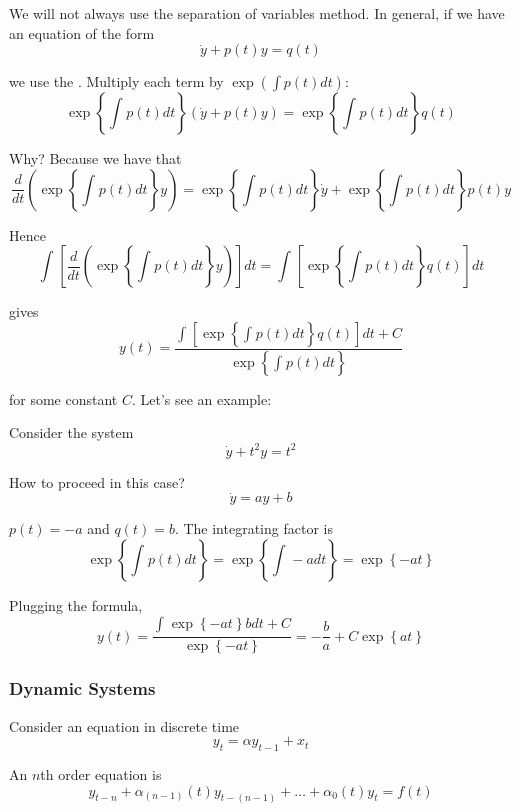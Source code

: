 \documentclass{article}
\begin{document}
We will not always use the separation of variables method. In general, if we have an equation of the form
\[
  \dot{y} + p(t) y = q(t)
\]

we use the . Multiply each term by $\exp(\int p(t) dt)$:
\[
  \exp\left\{\int_{}^{} p(t) dt\right\}
  \left(\dot{y} + p(t) y\right)
  =
  \exp\left\{\int_{}^{} p(t) dt\right\}
  q(t)
\]

Why? Because we have that
\[
  \dfrac{d}{dt}
  \left(
    \exp\left\{\int_{}^{} p(t) dt\right\}
    y
  \right)
  =
  \exp\left\{\int_{}^{} p(t) dt\right\} \dot{y}
  +
  \exp\left\{\int_{}^{} p(t) dt\right\} p(t) y
\]

Hence
\[
  \int_{}^{}
  \left[
    \dfrac{d}{dt}
    \left(
      \exp\left\{\int_{}^{} p(t) dt\right\}
      y
    \right)
  \right]
  dt
  =
  \int_{}^{}
  \left[
    \exp\left\{\int_{}^{} p(t) dt\right\}
    q(t)
  \right]
  dt
\]

gives
\[
  y(t)
  =
  \dfrac{
    \int_{}^{}
    \left[
      \exp\left\{\int_{}^{} p(t) dt\right\}
      q(t)
    \right]
    dt
    +
    C
  }{
    \exp\left\{\int_{}^{} p(t) dt\right\}
  }
\]

for some constant $C$. Let's see an example:

\begin{example}
  Consider the system
  \[
    \dot{y} + t^2 y = t^2
  \]

  How to proceed in this case?
  \[
    \dot{y} = ay + b
  \]

  $p(t) = -a$ and $q(t) = b$. The integrating factor is
  \[
    \exp\left\{\int_{}^{} p(t) dt\right\}
    =
    \exp\left\{\int_{}^{} -a dt\right\}
    =
    \exp\left\{-at\right\}
  \]

  Plugging the formula,
  \[
    y(t) =
    \dfrac{
      \int_{}^{}
      \exp\left\{-at\right\} b dt
      + C
    }{
      \exp\left\{-at\right\}
    }
    =
    - \dfrac{b}{a}
    + C \exp\left\{at\right\}
  \]
\end{example}

\subsubsection{Dynamic Systems}
\label{ssub:dynamic_systems}

Consider an equation in discrete time
\[
  y_t = \alpha y_{t - 1} + x_t
\]

An $n$th order  equation is
\[
  y_{t - n}
  + \alpha_{(n - 1)}(t) y_{t - (n - 1)}
  + \ldots
  + \alpha_{0}(t) y_{t}
  =
  f(t)
\]
\end{document}
